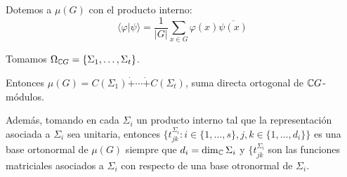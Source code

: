 \begin{teo}
  Dotemos a \(\mu(G)\) con el producto interno:
  \[
    \langle\varphi|\psi\rangle=\frac{1}{|G|}\sum_{x\in G}\varphi(x)
    \overline{\psi(x)}
  \]

  Tomamos \(\Omega_{\mathbb{C} G}=\{\Sigma_1,\ldots, \Sigma_t\}\).

  Entonces \(\mu(G)=C(\Sigma_1)\dot{+}\cdots\dot{+}C(\Sigma_t)\),
  suma directa ortogonal de \(\mathbb{C} G\)-módulos.

  Además, tomando en cada \(\Sigma_i\) un producto interno tal que
  la representación asociada a \(\Sigma_i\) sea unitaria, entonces
  \(\{t_{jk}^{\Sigma_i}:i\in\{1,\ldots,s\}, j,k\in\{1,\ldots, d_i\}\}\)
  es una base ortonormal de \(\mu(G)\) siempre que
  \(d_i=\dim_{\mathbb{C}}\Sigma_i\) y \(\{t_{jk}^{\Sigma_i}\) son las funciones
  matriciales asociados a \(\Sigma_i\) con respecto de una base otronormal
  de \(\Sigma_i\).
\end{teo}
